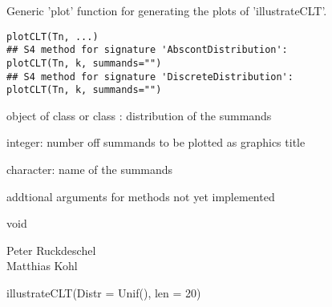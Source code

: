 \documentclass{article}
\begin{document}
\begin{Description}\relax
Generic 'plot' function for generating the plots of 'illustrateCLT'.
\end{Description}
\begin{Usage}
\begin{verbatim}plotCLT(Tn, ...)
## S4 method for signature 'AbscontDistribution':
plotCLT(Tn, k, summands="")
## S4 method for signature 'DiscreteDistribution':
plotCLT(Tn, k, summands="")
\end{verbatim}
\end{Usage}
\begin{Arguments}
\begin{ldescription}
\item[\code{Tn}] object of class  or class
: distribution of the summands
\item[\code{k}] integer: number off summands to be plotted as graphics title
\item[\code{summands}] character: name of the summands
\item[\code{...}] addtional arguments for methods not yet implemented 
\end{ldescription}
\end{Arguments}
\begin{Value}
void
\end{Value}
\begin{Author}\relax
Peter Ruckdeschel \\
Matthias Kohl 
\end{Author}
\begin{SeeAlso}\relax
{}
\end{SeeAlso}
\begin{Examples}
\begin{ExampleCode}
illustrateCLT(Distr = Unif(), len = 20)
\end{ExampleCode}
\end{Examples}
\end{document}
